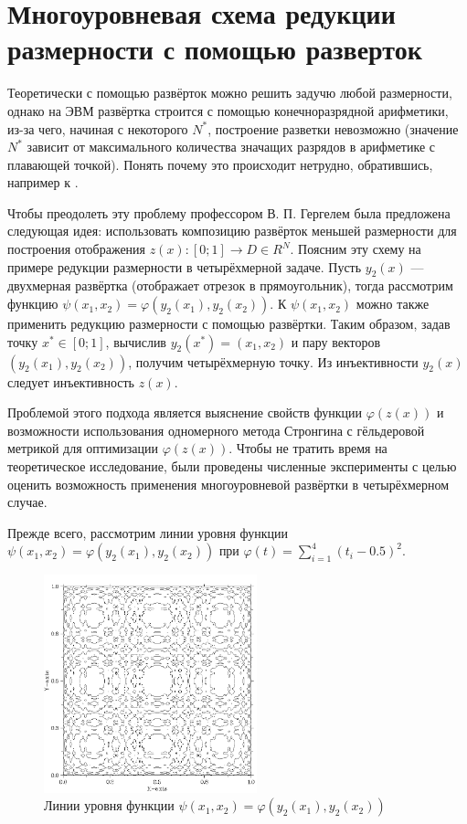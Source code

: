 \section{Многоуровневая схема редукции размерности с помощью разверток}
\label{sec:multilev_maps}
Теоретически с помощью развёрток можно решить задучю любой размерности, однако на ЭВМ развёртка строится с помощью конечноразрядной арифметики, из-за чего, начиная с некоторого \(N^*\),
построение разветки невозможно (значение \(N^*\) зависит от максимального количества значащих разрядов в арифметике с плавающей точкой).
Понять почему это происходит нетрудно, обратившись, например к \cite{strOptBook}.
\par
Чтобы преодолеть эту проблему профессором В. П. Гергелем была предложена следующая идея: использовать композицию развёрток меньшей размерности для построения отображения
\(z(x): [0;1] \rightarrow D \in R^N\).
Поясним эту схему на примере редукции размерности в четырёхмерной задаче. Пусть \(y_2(x)\) --- двухмерная развёртка (отображает отрезок в прямоугольник), тогда рассмотрим функцию
\(\psi(x_1,x_2)=\varphi(y_2(x_1), y_2(x_2))\). К \(\psi(x_1,x_2)\) можно также применить редукцию размерности с помощью развёртки. Таким образом, задав точку \(x^*\in [0;1]\),
вычислив \(y_2(x^*)=(x_1,x_2)\) и пару векторов \((y_2(x_1), y_2(x_2))\), получим четырёхмерную точку. Из инъективности \(y_2(x)\) следует инъективность \(z(x)\).
\par
Проблемой этого подхода является выяснение свойств функции \(\varphi(z(x))\) и возможности использования одномерного метода Стронгина с гёльдеровой метрикой для оптимизации \(\varphi(z(x))\).
Чтобы не тратить время на теоретическое исследование, были проведены численные эксперименты с целью оценить возможность применения многоуровневой развёртки в четырёхмерном случае.
\par
Прежде всего, рассмотрим линии уровня функции \(\psi(x_1,x_2)=\varphi(y_2(x_1), y_2(x_2))\) при \(\varphi(t)=\sum_{i=1}^{4}(t_i-0.5)^2\).
\begin{figure}[ht]
  \center
  \includegraphics[width=0.55\textwidth]{images/multimap_isolines.png}
  \caption{Линии уровня функции \(\psi(x_1,x_2)=\varphi(y_2(x_1), y_2(x_2))\)}
  \label{fig:1}
\end{figure}
